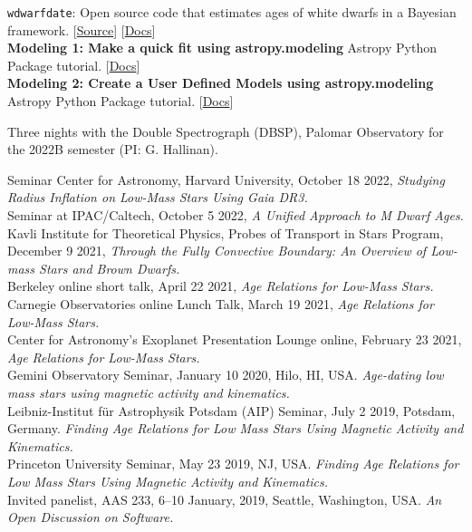 \documentclass[10pt]{cv}
\begin{document}
\begin{llist}

\texttt{wdwarfdate}: Open source code that estimates ages of white dwarfs in a Bayesian framework. [\href{https://github.com/rkiman/wdwarfdate}{Source}] [\href{https://wdwarfdate.readthedocs.io/en/latest/}{Docs}] \\
\textbf{Modeling 1: Make a quick fit using astropy.modeling}
Astropy Python Package tutorial. [\href{http://learn.astropy.org/rst-tutorials/Models-Quick-Fit.html?highlight=filtertutorials}{Docs}]\\
\textbf{Modeling 2: Create a User Defined Models using astropy.modeling}
Astropy Python Package tutorial. [\href{http://learn.astropy.org/rst-tutorials/User-Defined-Model.html?highlight=filtertutorials}{Docs}] 


Three nights with the Double Spectrograph (DBSP), Palomar Observatory for the 2022B semester (PI: G. Hallinan).



Seminar Center for Astronomy, Harvard University, October 18 2022, \textit{Studying Radius Inflation on Low-Mass Stars Using Gaia DR3.}\\
Seminar at IPAC/Caltech, October 5 2022, \textit{A Unified Approach to M Dwarf Ages.}\\
Kavli Institute for Theoretical Physics, Probes of Transport in Stars Program, December 9 2021, \textit{Through the Fully Convective Boundary: An Overview of Low-mass Stars and Brown Dwarfs.}\\
Berkeley online short talk, April 22 2021, \textit{Age Relations for Low-Mass Stars.}\\
Carnegie Observatories online Lunch Talk, March 19 2021, \textit{Age Relations for Low-Mass Stars.}\\
Center for Astronomy's Exoplanet Presentation Lounge online, February 23 2021, \textit{Age Relations for Low-Mass Stars.}\\ 
Gemini Observatory Seminar, January 10 2020, Hilo, HI, USA. \textit{Age-dating low mass stars using magnetic activity and kinematics.}\\
Leibniz-Institut f\"{u}r Astrophysik Potsdam (AIP) Seminar, July 2 2019, Potsdam, Germany. \textit{Finding Age Relations for Low Mass Stars Using Magnetic Activity and Kinematics.}\\
Princeton University Seminar, May 23 2019, NJ, USA. \textit{Finding Age Relations for Low Mass Stars Using Magnetic Activity and Kinematics.} \\
Invited panelist, AAS 233, 6--10 January, 2019, Seattle, Washington, USA. \textit{An Open Discussion on Software.} 


\end{llist}
\end{document}
